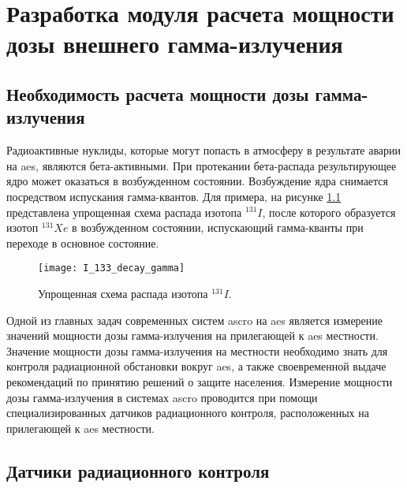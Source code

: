 
\chapter{Разработка модуля расчета мощности дозы внешнего гамма-излучения}
\label{chapter_dose}

\section{Необходимость расчета мощности дозы гамма-излучения}

Радиоактивные нуклиды, которые могут попасть в атмосферу в результате аварии на \ac{aes}, являются бета-активными. При 
протекании бета-распада результирующее ядро может оказаться в возбужденном состоянии. Возбуждение ядра снимается 
посредством испускания гамма-квантов. Для примера, на рисунке \ref{fig_I_133_decay_gamma} представлена упрощенная схема 
распада изотопа $^{131}I$, после которого образуется изотоп $^{131}Xe$ в возбужденном состоянии, испускающий 
гамма-кванты при переходе в основное состояние.

\begin{figure}[ht!]
    \centering
    \texttt{[image: I\_133\_decay\_gamma]}
    \captionsetup{justification=centering}
    \caption{Упрощенная схема распада изотопа $^{131}I$.}
    \label{fig_I_133_decay_gamma}
\end{figure}

Одной из главных задач современных систем \ac{ascro} на \ac{aes} является измерение значений мощности дозы 
гамма-излучения на прилегающей к \ac{aes} местности. Значение мощности дозы гамма-излучения на местности необходимо знать 
для контроля радиационной обстановки вокруг \ac{aes}, а также своевременной выдаче рекомендаций по принятию решений о 
защите населения. Измерение мощности дозы гамма-излучения в системах \ac{ascro} проводится при помощи 
специализированных датчиков радиационного контроля, расположенных на прилегающей к \ac{aes} местности. 

\section{Датчики радиационного контроля}

